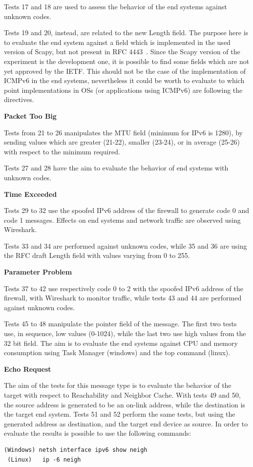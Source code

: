 \documentclass[12pt]{article}
\begin{document}
Tests 17 and 18 are used to assess the behavior of the end systems against unknown codes.

Tests 19 and 20, instead, are related to the new Length field. The purpose here is to evaluate the end system against a field which is implemented in the used version of Scapy, but not present in RFC 4443~\cite{rfc4443}. Since the Scapy version of the experiment is the development one, it is possible to find some fields which are not yet approved by the IETF. This should not be the case of the implementation of ICMPv6 in the end systems, nevertheless it could be worth to evaluate to which point implementations in OSs (or applications using ICMPv6) are following the directives.

\textbf{Packet Too Big}

Tests from 21 to 26 manipulates the MTU field (minimum for IPv6 is 1280), by sending values which are greater (21-22), smaller (23-24), or in average (25-26) with respect to the minimum required.

Tests 27 and 28 have the aim to evaluate the behavior of end systems with unknown codes.

\textbf{Time Exceeded}

Tests 29 to 32 use the spoofed IPv6 address of the firewall to generate code 0 and code 1 messages. Effects on end systems and network traffic are observed using Wireshark.

Tests 33 and 34 are performed against unknown codes, while 35 and 36 are using the RFC draft Length field with values varying from 0 to 255.

\textbf{Parameter Problem}

Tests 37 to 42 use respectively code 0 to 2 with the spoofed IPv6 address of the firewall, with Wireshark to monitor traffic, while tests 43 and 44 are performed against unknown codes.

Tests 45 to 48 manipulate the pointer field of the message. The first two tests use, in sequence, low values (0-1024), while the last two use high values from the 32 bit field. The aim is to evaluate the end systems against CPU and memory consumption using Task Manager (windows) and the top command (linux).

\textbf{Echo Request}

The aim of the tests for this message type is to evaluate the behavior of the target with respect to Reachability and Neighbor Cache. With tests 49 and 50, the source address is generated to be an on-link address, while the destination is the target end system. Tests 51 and 52 perform the same tests, but using the generated address as destination, and the target end device as source. In order to evaluate the results is possible to use the following commands:
\begin{lstlisting}[style=python,basicstyle=\ttfamily\small]
 (Windows) netsh interface ipv6 show neigh
 (Linux)   ip -6 neigh
\end{lstlisting}
\end{document}
